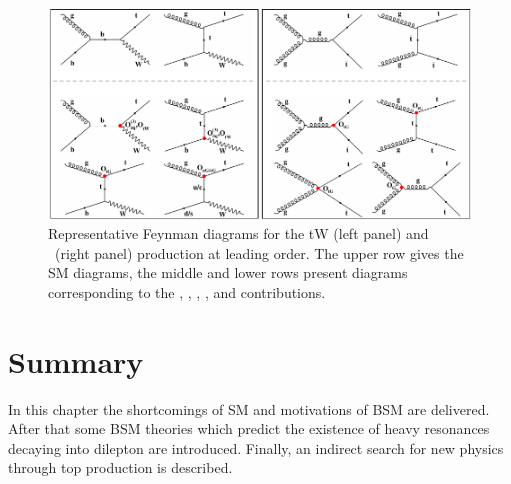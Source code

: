 \begin{figure}[t]
\centering\includegraphics[width=1\textwidth]{figures/tW/fig/fey}
\caption{Representative Feynman diagrams for the tW (left panel) and \ttbar~(right panel) production at leading order. The upper row gives the SM diagrams, the middle and lower rows  present diagrams corresponding to the \Ophiq, \OtW, \OtG, \OG, and \OucG contributions.}\label{fig-feyn}
\end{figure}

\section{Summary}

In this chapter the shortcomings of SM and motivations of BSM are delivered. After that some BSM theories which predict the existence of heavy resonances decaying into dilepton are introduced. Finally, an indirect search for new physics through top production is described.

